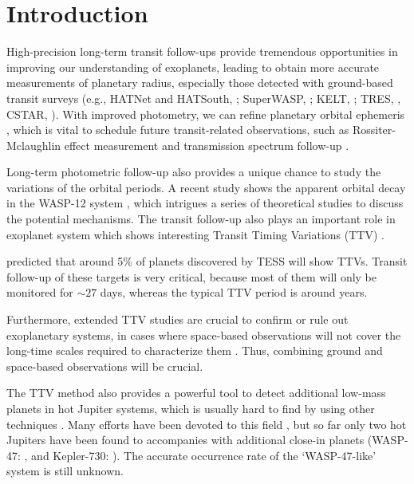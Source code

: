 \section{Introduction}

High-precision long-term transit follow-ups provide tremendous opportunities in improving our understanding of exoplanets, leading to obtain more accurate measurements of planetary radius, especially those detected with ground-based transit surveys (e.g., HATNet and HATSouth, \citealt{Bakos2012}; SuperWASP, \citealt{Pollacco2006}; KELT, \citealt{Pepper2007}; TRES, \citealt{Alonso2007}, CSTAR, \citealt{WangS2014}). With improved photometry, we can refine planetary orbital ephemeris \citep{TEMP1}, which is vital to schedule future transit-related observations, such as Rossiter-Mclaughlin effect measurement \citep{Nutzman2011,Sanchis2011,Sanchis2013,WangS2018} and transmission spectrum follow-up \citep{Mancini2016b,Mackebrandt2017}.

Long-term photometric follow-up also provides a unique chance to study the variations of the orbital periods. A recent study shows the apparent orbital decay in the WASP-12 system \citep{Patra2017}, which intrigues a series of theoretical studies \citep{Millholland2018,Weinberg2017} to discuss the potential mechanisms. The transit follow-up also plays an important role in exoplanet system which shows interesting Transit Timing Variations (TTV) \citep{Ballard2011,Ford2012a,Steffen2012,Fabrycky2012,Mancini2016,WangS2017,Wu2018}. 

\cite{Ballard2018} predicted that around 5\% of planets discovered by TESS \citep{Ricker2014} will show TTVs. Transit follow-up of these targets is very critical, because most of them will only be monitored for $\sim27$ days, whereas the typical TTV period is around years. 

Furthermore, extended TTV studies are crucial to confirm or rule out exoplanetary systems, in cases where space-based observations will not cover the long-time scales required to characterize them \citep{vonEssen2018}. Thus, combining ground and space-based observations will be crucial. 

The TTV method \citep{Miralda2002,Agol2005,Holman2005}  also provides a powerful tool to detect additional low-mass planets in hot Jupiter systems, which is usually hard to find by using other techniques \citep{Steffen2012b}. Many efforts have been devoted to this field \citep{Pal2011,Hoyer2012,Hoyer2013,Szabo2013}, but so far only two hot Jupiters have been found to accompanies with additional close-in planets (WASP-47: \cite{Becker2015}, and Kepler-730: \cite{Canas2019}). The accurate occurrence rate of the `WASP-47-like' system is still unknown.

